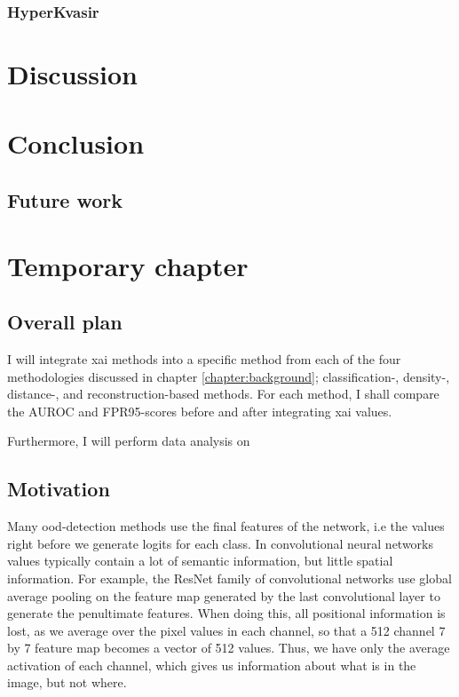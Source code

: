 \documentclass[UKenglish]{uiomasterthesis} %
\theoremstyle{definition}
\begin{document}
\subsection{HyperKvasir}

\chapter{Discussion} \label{chapter:discussion}

\chapter{Conclusion} \label{chapter:conclusion}

\section{Future work}

\chapter{Temporary chapter} \label{chapter:newmethod}


\section{Overall plan}

I will integrate \ac{xai} methods into a specific method from each of the four methodologies discussed in chapter \ref{chapter:background}; classification-, density-, distance-, and reconstruction-based methods. For each method, I shall compare the AUROC and FPR95-scores before and after integrating \ac{xai} values.

Furthermore, I will perform data analysis on 

\section{Motivation} \label{chapter:tempmotivation}

Many \ac{ood}-detection methods use the final features of the network, i.e the values right before we generate logits for each class. In convolutional neural networks values typically contain a lot of semantic information, but little spatial information. For example, the ResNet family of convolutional networks use global average pooling on the feature map generated by the last convolutional layer to generate the penultimate features. When doing this, all positional information is lost, as we average over the pixel values in each channel, so that a 512 channel 7 by 7 feature map becomes a vector of 512 values. Thus, we have only the average activation of each channel, which gives us information about what is in the image, but not where.
\end{document}
